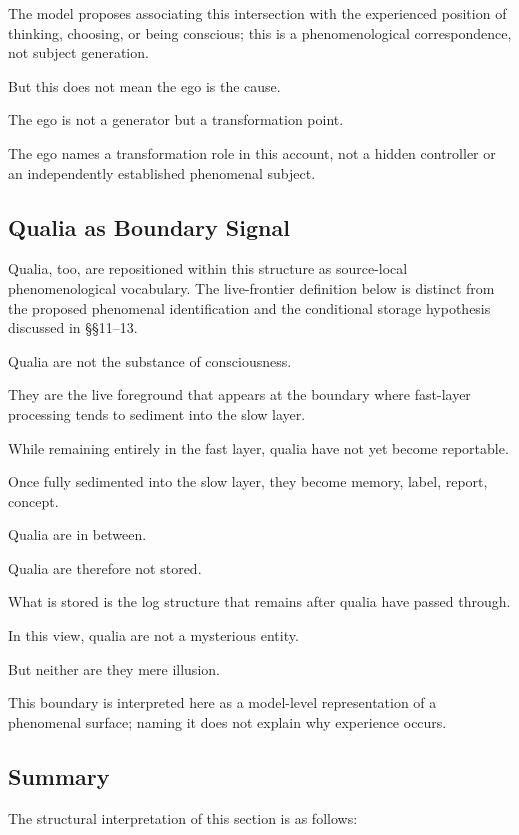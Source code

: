 The model proposes associating this intersection with the experienced position of thinking, choosing, or being conscious; this is a phenomenological correspondence, not subject generation.

But this does not mean the ego is the cause.

The ego is not a generator but a transformation point.

The ego names a transformation role in this account, not a hidden controller or an independently established phenomenal subject.

\subsection{Qualia as Boundary Signal}


Qualia, too, are repositioned within this structure as source-local phenomenological vocabulary. The live-frontier definition below is distinct from the proposed phenomenal identification and the conditional storage hypothesis discussed in §§11--13.

Qualia are not the substance of consciousness.

They are the live foreground that appears at the boundary where fast-layer processing tends to sediment into the slow layer.

While remaining entirely in the fast layer, qualia have not yet become reportable.

Once fully sedimented into the slow layer, they become memory, label, report, concept.

Qualia are in between.

Qualia are therefore not stored.

What is stored is the log structure that remains after qualia have passed through.

In this view, qualia are not a mysterious entity.

But neither are they mere illusion.

This boundary is interpreted here as a model-level representation of a phenomenal surface; naming it does not explain why experience occurs.

\subsection{Summary}


The structural interpretation of this section is as follows:

